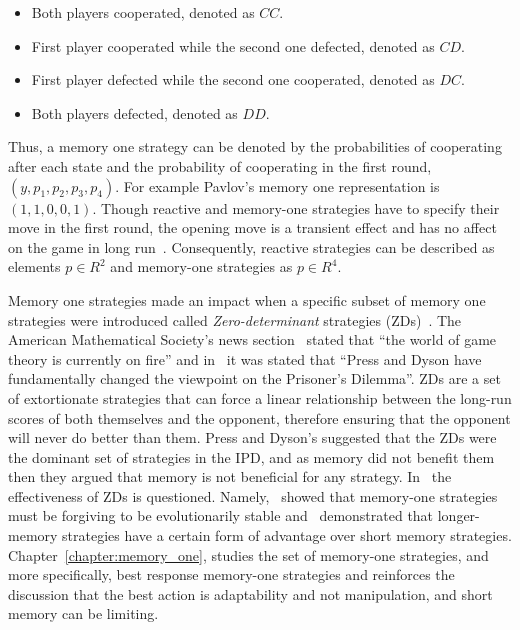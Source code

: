 \begin{itemize}
    \item Both players cooperated, denoted as \(CC\).
    \item First player cooperated while the second one defected, denoted as \(CD\).
    \item First player defected while the second one cooperated, denoted as \(DC\).
    \item Both players defected, denoted as \(DD\).
\end{itemize}

Thus, a memory one strategy can be denoted by the probabilities of cooperating
after each state and the probability of cooperating in the first round, \((y,
p_1, p_2, p_3, p_4)\). For example Pavlov's memory one representation is \((1,
1, 0, 0, 1)\). Though reactive and memory-one strategies have to specify their
move in the first round, the opening move is a transient effect and has no affect
on the game in long run~\cite{sigmund2010calculus}. Consequently, reactive strategies
can be described as elements \(p \in R^2\) and memory-one strategies as \(p \in R^4\).

Memory one strategies made an impact when a specific subset of memory one
strategies were introduced called \textit{Zero-determinant} strategies
(ZDs)~\cite{Press2012}. The American Mathematical Society's news section~\cite{Hilbe2015}
stated that ``the world of game theory is currently on fire'' and in~\cite{Stewart2012}
it was stated that
``Press and Dyson have fundamentally changed the viewpoint on the Prisoner's Dilemma''.
ZDs are a set of
extortionate strategies that can force a linear relationship between
the long-run scores of both themselves and the opponent, therefore ensuring that the
opponent will never do better than them. Press and Dyson's suggested that the ZDs
were the dominant set of strategies in the
IPD, and as memory did not benefit them then they argued that memory is not beneficial for any strategy. In~\cite{Adami2013, Knight2017,
Hilbe2013, Hilbe2013b, Hilbe2015, KnightHGC17, Knight2019, Lee2015, Stewart2012} the
effectiveness of ZDs is questioned. Namely,~\cite{Stewart2013, Stewart2016}
showed that memory-one strategies must be forgiving to be evolutionarily stable
and~\cite{Knight2017, Hilbe2017, KnightHGC17, Knight2019, Lee2015, Pan2015} demonstrated
that longer-memory strategies have a certain form of advantage over short memory
strategies. Chapter~\ref{chapter:memory_one}, studies the set of memory-one strategies,
and more specifically, best response memory-one strategies and reinforces the
discussion that the best action is adaptability and not manipulation, and short
 memory can be limiting.

